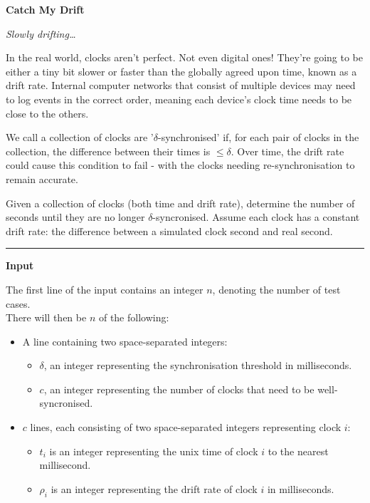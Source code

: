 \LARGE {} \textbf{Catch My Drift} \normalsize

{\itshape Slowly drifting\dots}

In the real world, clocks aren't perfect. 
Not even digital ones!
They're going to be either a tiny bit slower or faster than the globally agreed upon time, known as a drift rate.
Internal computer networks that consist of multiple devices may need to log events in the correct order, meaning each device's clock time needs to be close to the others.

We call a collection of clocks are '$\delta$-synchronised' if, for each pair of clocks in the collection, the difference between their times is $\leq \delta$.
Over time, the drift rate could cause this condition to fail - with the clocks needing re-synchronisation to remain accurate.

Given a collection of clocks (both time and drift rate), determine the number of seconds until they are no longer $\delta$-syncronised.
Assume each clock has a constant drift rate: the difference between a simulated clock second and real second.

\vspace{8pt}
\hrule

\textbf{Input}

The first line of the input contains an integer $n$, denoting the number of test cases. \\
There will then be $n$ of the following:
\begin{itemize}
    \item A line containing two space-separated integers:
    \begin{itemize}
        \item $\delta$, an integer representing the synchronisation threshold in milliseconds.
        \item $c$, an integer representing the number of clocks that need to be well-syncronised.
    \end{itemize}
    \item $c$ lines, each consisting of two space-separated integers representing clock $i$:
    \begin{itemize}
        \item $t_i$ is an integer representing the unix time of clock $i$ to the nearest millisecond.
        \item $\rho_i$ is an integer representing the drift rate of clock $i$ in milliseconds.
    \end{itemize}
\end{itemize}

